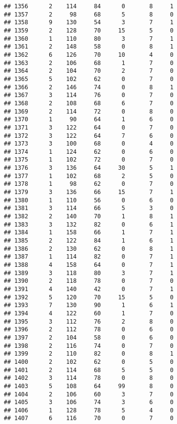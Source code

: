 \documentclass[
]{article}
\begin{document}
\begin{verbatim}
## 1356      2    114     84      0       8     1
## 1357      2     98     68      5       8     0
## 1358      9    130     54      3       7     1
## 1359      2    128     70     15       5     0
## 1360      1    110     80      3       7     1
## 1361      2    148     58      0       8     1
## 1362      6    126     70     10       4     0
## 1363      2    106     68      1       7     0
## 1364      2    104     70      2       7     0
## 1365      5    102     62      0       7     0
## 1366      2    146     74      0       8     1
## 1367      3    114     76      0       7     0
## 1368      2    108     68      6       7     0
## 1369      2    114     72      0       8     0
## 1370      1     90     64      1       6     0
## 1371      3    122     64      0       7     0
## 1372      3    122     64      7       6     0
## 1373      3    100     68      0       4     0
## 1374      1    124     62      0       6     0
## 1375      1    102     72      0       7     0
## 1376      3    136     64     30       5     1
## 1377      1    102     68      2       5     0
## 1378      1     98     62      0       7     0
## 1379      3    136     66     15       7     1
## 1380      1    110     56      0       6     0
## 1381      3    114     66      5       3     0
## 1382      2    140     70      1       8     1
## 1383      3    132     82      0       6     1
## 1384      1    158     66      1       7     1
## 1385      2    122     84      1       6     1
## 1386      2    130     62      0       8     1
## 1387      1    114     82      0       7     1
## 1388      4    158     64      0       7     1
## 1389      3    118     80      3       7     1
## 1390      2    118     78      0       7     0
## 1391      4    140     42      0       7     1
## 1392      5    120     70     15       5     0
## 1393      7    130     90      1       6     1
## 1394      4    122     60      1       7     0
## 1395      3    112     76      2       8     0
## 1396      2    112     78      0       6     0
## 1397      2    104     58      0       6     0
## 1398      2    116     74      0       7     0
## 1399      2    110     82      0       8     1
## 1400      2    102     62      0       5     0
## 1401      2    114     68      5       5     0
## 1402      3    114     78      0       8     0
## 1403      5    108     64     99       8     0
## 1404      2    106     60      3       7     0
## 1405      3    106     74      3       6     0
## 1406      1    128     78      5       4     0
## 1407      6    116     70      0       7     0

\end{verbatim}
\end{document}
